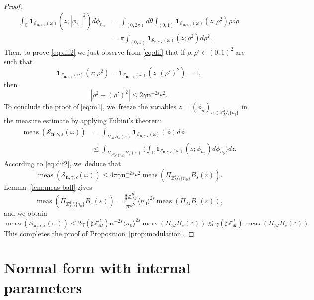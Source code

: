 \documentclass[JEP,XML,SOM,Unicode,published]{cedram}
\theoremstyle{plain}
\theoremstyle{definition}
\DeclareMathOperator{\meas}{meas}
\newcommand{\nb}{{\boldsymbol n}}
\newcommand{\Z}{\mathbb{Z}}
\newcommand{\C}{\mathbb{C}}
\newcommand{\1}{\mathbf{1}}
\let\epsilon\varepsilon
\begin{document}
\begin{proof}
\begin{equation*}
\begin{split}
\int_{\C}\mathbf{1}_{\mathcal{S}_{\nb,\gamma,\epsilon}(\omega)}(z; |\phi_{n_{0}}|^{2})d\phi_{n_0}
&= \int_{(0,2\pi)}d\theta\int_{(0,1)}\mathbf{1}_{\mathcal{S}_{\nb,\gamma,\epsilon}(\omega)}(z ; \rho^{2})\rho d\rho \\
&= \pi\int_{(0,1)}\mathbf{1}_{\mathcal{S}_{\nb,\gamma,\epsilon}(\omega)}(z ; \rho^{2})d\rho^{2}.
\end{split}
\end{equation*}
Then, to prove \eqref{eq:dif2} we just observe from \eqref{eq:dif} that if $\rho,\rho'\in(0,1)^2$ are such that
\[
\mathbf{1}_{\mathcal{S}_{\nb,\gamma,\epsilon}(\omega)}(z;\rho^2) =\mathbf{1}_{\mathcal{S}_{\nb,\gamma,\epsilon}(\omega)}(z ;(\rho')^{2})=1,
\]
then
\[
|\rho^{2} -(\rho')^{2}| \leq 2\gamma\nb_-^{-2s}\epsilon^2.
\]
To conclude the proof of \eqref{eq:m1}, we~freeze the variables $z=(\phi_{n})_{n\in\Z_{M}^{d}\setminus\{n_{0}\}}$ in the measure estimate by applying Fubini's theorem:
\begin{equation*}
\begin{split}
\meas(\mathcal{S}_{\nb,\gamma,\epsilon}(\omega))
&= \int_{\Pi_{M}B_{s}(\epsilon)}
\mathbf{1}_{\mathcal{S}_{\nb,\gamma,\epsilon}(\omega)}(\phi)d\phi \\
&\leq \int_{\Pi_{\Z_{M}^{d}\setminus\{n_{0}\}}B_{s}(\epsilon)}
\Big(\int_{\C}
\mathbf{1}_{\mathcal{S}_{\nb,\gamma,\epsilon}(\omega)}(z;\phi_{n_{0}})d\phi_{n_{0}}\Big)dz.
\end{split}
\end{equation*}
According to \eqref{eq:dif2}, we~deduce that
\[
\meas(\mathcal{S}_{\nb,\gamma,\epsilon}(\omega)) \leq 4\pi\gamma\nb_{-}^{-2s}\epsilon^{2}\meas(\Pi_{\Z_{M}^{d}\setminus\{n_{0}\}}B_{s}(\epsilon)).
\]
Lemma~\ref{lem:meas-ball} gives
\[
\meas(\Pi_{\Z_{M}^{d}\setminus\{n_{0}\}}B_{s}(\epsilon))
=\frac{\sharp\Z_{M}^{d}}{\pi \epsilon^{2}}\langle n_{0}\rangle^{2s}
\meas(\Pi_{M}B_{s}(\epsilon)),
\]
and we obtain
\[
\meas(\mathcal{S}_{\nb,\gamma,\epsilon}(\omega)) \leq 2\gamma (\sharp\Z_{M}^{d})\nb^{-2s}\langle n_{0}\rangle^{2s} \meas(\Pi_{M}B_{s}(\epsilon)) \lesssim\gamma(\sharp\Z_{M}^{d})\meas(\Pi_{M}B_{s}(\epsilon)).
\]
This completes the proof of Proposition~\ref{prop:modulation}.
\end{proof}

\section{Normal form with internal parameters}
\label{sec:main-nf}
\end{document}
